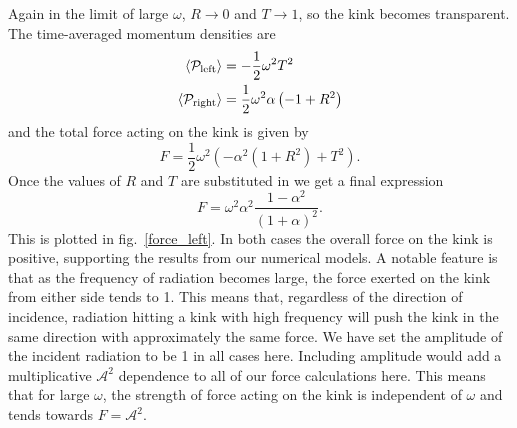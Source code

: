 \documentclass[11pt, oneside]{article}  	%
\numberwithin{equation}{section}
\begin{document}
Again in the limit of large $\omega$, $R \rightarrow 0$ and $T \rightarrow 1$, so the kink becomes transparent. The time-averaged momentum densities are
\begin{align}
 \left \langle \mathcal{P}_\textup{left} \right \rangle &= -\frac{1}{2}\omega^2 T^2 \\
 \left \langle \mathcal{P}_\textup{right} \right \rangle &= \frac{1}{2}\omega^2\alpha \left( -1 + R^2 \right) 
\end{align}
and the total force acting on the kink is given by
\begin{equation}
F = \frac{1}{2} \omega^2 \left ( -\alpha^2(1 +R^2) + T^2 \right ) .
\end{equation}
Once the values of $R$ and $T$ are substituted in we get a final expression
\begin{equation}
F = \omega^2 \alpha^2 \frac{1-\alpha^2}{(1+\alpha)^2} .
\end{equation}
This is plotted in fig.~\ref{force_left}. In both cases the overall force on the kink is positive, supporting the results from our numerical models. A notable feature is that as the frequency of radiation becomes large, the force exerted on the kink from either side tends to 1. This means that, regardless of the direction of incidence, radiation hitting a kink with high frequency will push the kink in the same direction with approximately the same force. We have set the amplitude of the incident radiation to be 1 in all cases here. Including amplitude would add a multiplicative $\mathcal{A}^2$ dependence to all of our force calculations here. This means that for large $\omega$, the strength of force acting on the kink is independent of $\omega$ and tends towards $F = \mathcal{A}^2$. 
\end{document}
